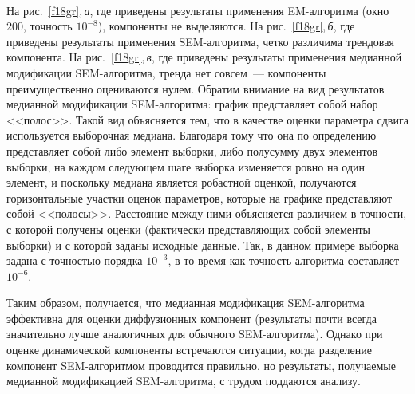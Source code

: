 \begin{multicols}{2}
\begin{figure*}
\vspace*{1pt}
\begin{center}
\mbox{%
\epsfxsize=115.404mm
}
\end{center}
\vspace*{-9pt}
\end{figure*}

На рис.~\ref{f18gr},\,\textit{а}, где приведены результаты применения
EM-алгоритма (окно~$200$, точность $10^{-8}$), компоненты не
выделяются. На рис.~\ref{f18gr},\,\textit{б}, где приведены результаты
применения SEM-ал\-го\-рит\-ма, четко различима трендовая компонента. На
рис.~\ref{f18gr},\,\textit{в}, где приведены результаты применения медианной
модификации SEM-алгоритма, тренда нет совсем~--- компоненты
преимущественно оцениваются нулем. Обратим внимание на вид
результатов медианной модификации SEM-алгоритма: график
представляет собой набор <<полос>>. Такой вид объясняется тем, что
в качестве оценки параметра сдвига используется выборочная
медиана. Благодаря тому что она по определению пред\-став\-ля\-ет собой
либо элемент выборки, либо полусумму двух элементов выборки, на
каждом следующем шаге выборка изменяется ровно на один элемент, и
поскольку медиана является робастной оценкой, получаются
горизонтальные участки оценок параметров, которые на графике
представляют собой <<полосы>>. Расстояние между ними объясняется
различием в точности, с которой получены оценки (фактически
пред\-став\-ля\-ющих собой элементы выборки) и с которой заданы исходные
данные. Так, в данном примере выборка задана с точностью порядка
$10^{-3}$, в то время как точность алгоритма составляет $10^{-6}$.

Таким образом, получается, что медианная модификация SEM-алгоритма
эффективна для оценки диффузионных компонент (результаты почти\linebreak
всегда значительно лучше аналогичных для обычного SEM-алгоритма).
Однако при оценке динамической компоненты встречаются ситуации,
когда разделение компонент SEM-алгоритмом\linebreak
проводится правильно, но
результаты, получаемые медианной модификацией SEM-алгоритма, с
трудом поддаются анализу.


\end{multicols}
